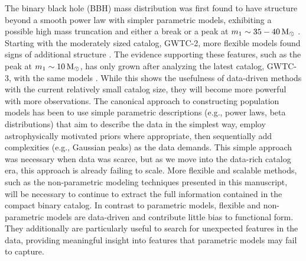 The binary black hole (BBH) mass distribution was first found to have structure beyond a smooth power law with simpler parametric models, exhibiting a possible high mass truncation and either a break or a peak at $m_1\sim35-40\,{\rm M}_\odot$ \citep{Fishbach_2017,Talbot_2018,o1o2_pop,o3a_pop}. Starting with the moderately sized catalog, GWTC-2, more flexible models found signs of additional structure \citep{Tiwari_2021_b,Edelman_2022ApJ}. The evidence supporting these features, 
such as the peak at $m_1\sim10\,{\rm M}_\odot$, has only grown after analyzing the latest catalog, GWTC-3, with the same models \citep{o3b_astro_dist,Tiwari_2022ApJ}. 
While this shows the usefulness of data-driven methods with the current relatively small catalog size, they will become more powerful with more observations. The canonical approach to constructing population models has been 
to use simple parametric descriptions (e.g., power laws, beta distributions) that aim to describe the data in the simplest way, employ astrophysically motivated priors where appropriate, then sequentially add 
complexities (e.g., Gaussian peaks) as the data demands. This simple approach was necessary when data was scarce, but as we move into the data-rich catalog era, this approach is already failing to scale.  More flexible and scalable methods, such as the non-parametric modeling techniques presented in this manuscript, will be necessary to continue to extract the full information contained in the compact binary catalog. In contrast to parametric models, flexible and non-parametric models are data-driven and contribute little bias to functional form. They additionally are particularly useful to search for unexpected features in the 
data, providing meaningful insight into features that parametric models may fail to capture.

